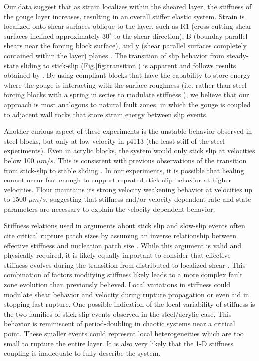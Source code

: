 Our data suggest that as strain localizes within the sheared layer, the
stiffness of the gouge layer increases, resulting in an overall stiffer elastic
system. Strain is localized onto shear surfaces oblique to the layer, such as R1
(cross cutting shear surfaces inclined approximately $30^\circ$ to the shear
direction), B (bounday parallel shears near the forcing block surface), and y
(shear parallel surfaces completely contained within the layer) planes
\cite{loganl1992fabrics,Marone_1998}.  The transition of slip behavior from
steady-state sliding to stick-slip (Fig.\ref{fig:transition}) is apparent and
follows results obtained by \cite{Baumberger_1999}. By using compliant blocks
that have the capability to store energy where the gouge is interacting with the
surface roughness (i.e. rather than steel forcing blocks with a spring in series
to modulate stiffness \cite{Kaproth:2013jz}), we believe that our approach is
most analogous to natural fault zones, in which the gouge is coupled to adjacent
wall rocks that store strain energy between slip events.

Another curious aspect of these experiments is the unstable behavior observed in
steel blocks, but only at low velocity in p4113 (the least stiff of the steel
experiments).  Even in acrylic blocks, the system would only stick slip at
velocities below 100 $\mu m/s$.  This is consistent with previous observations
of the transition from stick-slip to stable sliding \cite{Heslot:1994uc}. In our
experiments, it is possible that healing cannot occur fast enough to support
repeated stick-slip behavior at higher velocities.  Flour maintains its strong
velocity weakening behavior at velocities up to 1500 $\mu m/s$, suggesting that
stiffness and/or velocity dependent rate and state parameters are necessary to
explain the velocity dependent behavior.

Stiffness relations used in arguments about stick slip and slow-slip events
often cite critical rupture patch sizes by assuming an inverse relationship
between effective stiffness and nucleation patch size \cite{Ikari_2011}. While
this argument is valid and physically required, it is likely equally important
to consider that effective stiffness evolves during the transition from
distributed to localized shear \cite{Marone2015}. This combination of factors
modifying stiffness likely leads to a more complex fault zone evolution than
previously believed. Local variations in stiffness could modulate shear behavior
and velocity during rupture propagation or even aid in stopping fast rupture.
One possible indication of the local variability of stiffness is the two
families of stick-slip events observed in the steel/acrylic case. This behavior
is reminiscent of period-doubling in chaotic systems near a critical point.
These smaller events could represent local heterogeneities  which are too small
to rupture the entire layer. It is also very likely that the 1-D stiffness
coupling is inadequate to fully describe the system.

